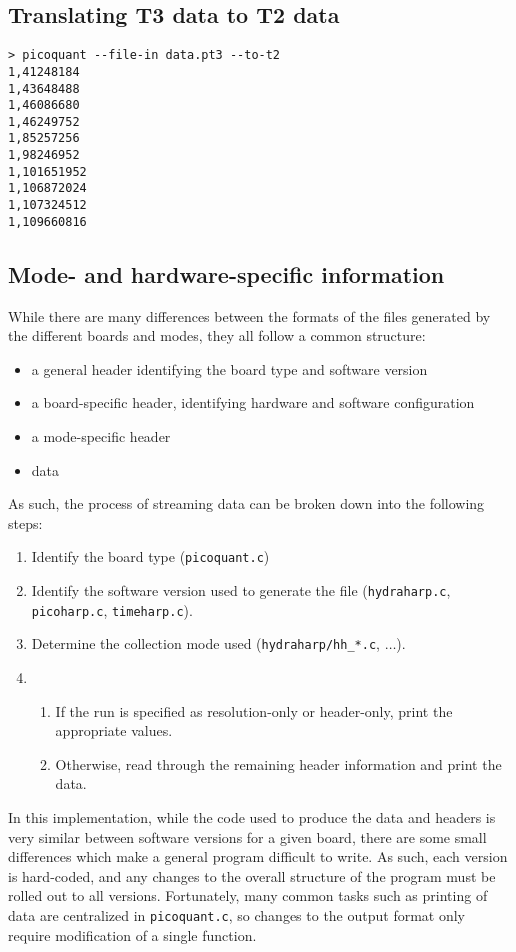 \documentclass{article}
\begin{document}
\subsection{Translating T3 data to T2 data}
\begin{verbatim}
> picoquant --file-in data.pt3 --to-t2
1,41248184
1,43648488
1,46086680
1,46249752
1,85257256
1,98246952
1,101651952
1,106872024
1,107324512
1,109660816
\end{verbatim}

\subsection{Mode- and hardware-specific information}
\label{sec:formats}

While there are many differences between the formats of the files generated by the different boards and modes, they all follow a common structure:
\begin{itemize}
\item a general header identifying the board type and software version
\item a board-specific header, identifying hardware and software configuration
\item a mode-specific header
\item data
\end{itemize}

As such, the process of streaming data can be broken down into the following steps:
\begin{enumerate}
\item Identify the board type (\texttt{picoquant.c})
\item Identify the software version used to generate the file (\texttt{hydraharp.c}, \texttt{picoharp.c}, \texttt{timeharp.c}).
\item Determine the collection mode used (\texttt{hydraharp/hh\_*.c}, $\ldots$).
\item  \begin{enumerate}
  \item If the run is specified as resolution-only or header-only, print the appropriate values.
  \item Otherwise, read through the remaining header information and print the data.
  \end{enumerate}
\end{enumerate}

In this implementation, while the code used to produce the data and headers is very similar between software versions for a given board, there are some small differences which make a general program difficult to write. As such, each version is hard-coded, and any changes to the overall structure of the program must be rolled out to all versions. Fortunately, many common tasks such as printing of data are centralized in \texttt{picoquant.c}, so changes to the output format only require modification of a single function.
\end{document}
